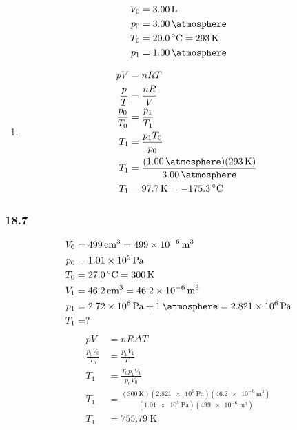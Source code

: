 \documentclass{article}
\begin{document}
\begin{align*}
	V_0 & = \SI{3.00}{\liter} \\
	p_0 & = \SI{3.00}{\atmosphere} \\
	T_0 & = \SI{20.0}{\celsius} = \SI{293}{\kelvin} \\
	p_1 & = \SI{1.00}{\atmosphere}
\end{align*}
\begin{enumerate}[label = \boldalph]
	\item
		\begin{align*}
			pV & = nRT \\
			\frac{ p }{ T } & = \frac{ nR }{ V } \\
			\frac{ p_0 }{ T_0 } & = \frac{ p_1 }{ T_1 } \\
			T_1 & = \frac{ p_1T_0 }{ p_0 } \\
			T_1 & = \frac{ (\SI{1.00}{\atmosphere})(\SI{293}{\kelvin}) }{ \SI{3.00}{\atmosphere} } \\
			T_1 & = \SI{97.7}{\kelvin} = \SI{-175.3}{\celsius}
		\end{align*}
\end{enumerate}

\subsubsection{18.7}

\begin{align*}
	V_0 & = \SI{499}{\centi \meter \cubed} = \SI{499e-6}{\meter \cubed} \\
	p_0 & = \SI{1.01e5}{\pascal} \\
	T_0 & = \SI{27.0}{\celsius} = \SI{300}{\kelvin} \\
	V_1 & = \SI{46.2}{\centi \meter \cubed} = \SI{46.2e-6}{\meter \cubed} \\
	p_1 & = \SI{2.72e6}{\pascal} + \SI{1}{\atmosphere} = \SI{2.821e6}{\pascal} \\
	T_1 & = ?
\end{align*}
\begin{align*}
	pV & = nR \Delta T \\
	\frac{ p_0V_0 }{ T_0 } & = \frac{ p_1V_1 }{ T_1 } \\
	T_1 & = \frac{ T_0p_1V_1 }{ p_0V_0 } \\
	T_1 & = \frac{ (\SI{300}{\kelvin})(\SI{2.821e6}{\pascal})(\SI{46.2e-6}{\meter \cubed}) }{ (\SI{1.01e5}{\pascal})(\SI{499e-6}{\meter \cubed}) } \\
	T_1 & = \SI{755.79}{\kelvin}
\end{align*}
\end{document}

